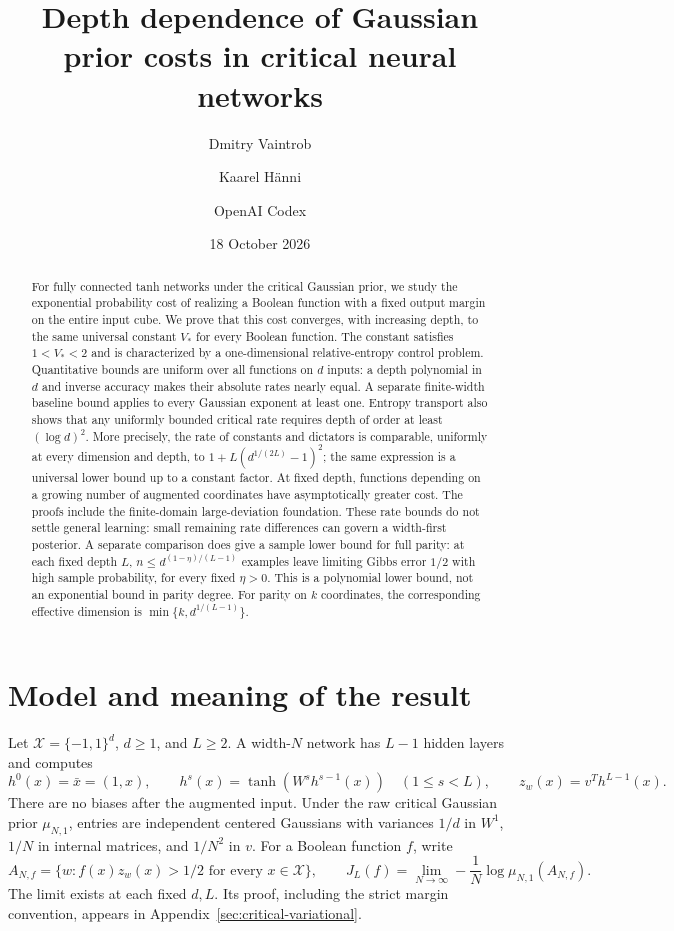 \documentclass[11pt]{article}
\title{Depth dependence of Gaussian prior costs in critical neural networks}
\author{Dmitry Vaintrob \and Kaarel H\"anni \and OpenAI Codex}
\date{18 October 2026}
\begin{document}
\maketitle
\begin{abstract}
For fully connected tanh networks under the critical Gaussian prior, we
study the exponential probability cost of realizing a Boolean function
with a fixed output margin on the entire input cube. We prove that this
cost converges, with increasing depth, to the same universal constant
$V_*$ for every Boolean function. The constant satisfies $1<V_*<2$ and
is characterized by a one-dimensional relative-entropy control problem.
Quantitative bounds are uniform over all functions on $d$ inputs: a
depth polynomial in $d$ and inverse accuracy makes their absolute rates
nearly equal. A separate finite-width baseline bound applies to every Gaussian
exponent at least one. Entropy transport also shows that any uniformly
bounded critical rate requires depth of order at least $(\log d)^2$.
More precisely, the rate of constants and dictators is comparable,
uniformly at every dimension and depth, to
$1+L(d^{1/(2L)}-1)^2$; the same expression is a universal lower bound
up to a constant factor. At fixed depth, functions depending on a growing
number of augmented coordinates have asymptotically greater cost.
The proofs include the finite-domain large-deviation foundation.
These rate bounds do not settle general learning: small remaining rate
differences can govern a width-first posterior. A separate comparison
does give a sample lower bound for full parity: at each fixed depth $L$,
$n\le d^{(1-\eta)/(L-1)}$ examples leave limiting Gibbs error $1/2$
with high sample probability, for every fixed $\eta>0$. This is a
polynomial lower bound, not an exponential bound in parity degree.
For parity on $k$ coordinates, the corresponding effective dimension is
$\min\{k,d^{1/(L-1)}\}$.
\end{abstract}

\section{Model and meaning of the result}

Let $\mathcal X=\{-1,1\}^d$, $d\ge1$, and $L\ge2$. A width-$N$
network has $L-1$ hidden layers and computes
\[
 h^0(x)=\bar x=(1,x),\qquad
 h^s(x)=\tanh(W^s h^{s-1}(x))\quad(1\le s<L),\qquad
 z_w(x)=v^T h^{L-1}(x).
\]
There are no biases after the augmented input. Under the raw critical
Gaussian prior $\mu_{N,1}$, entries are independent centered Gaussians
with variances $1/d$ in $W^1$, $1/N$ in internal matrices, and $1/N^2$
in $v$. For a Boolean function $f$, write
\[
 A_{N,f}=\{w:f(x)z_w(x)>1/2\text{ for every }x\in\mathcal X\},
 \qquad
 J_L(f)=\lim_{N\to\infty}-\frac1N\log\mu_{N,1}(A_{N,f}).
\]
The limit exists at each fixed $d,L$. Its proof, including the strict
margin convention, appears in Appendix~\ref{sec:critical-variational}.
\end{document}
